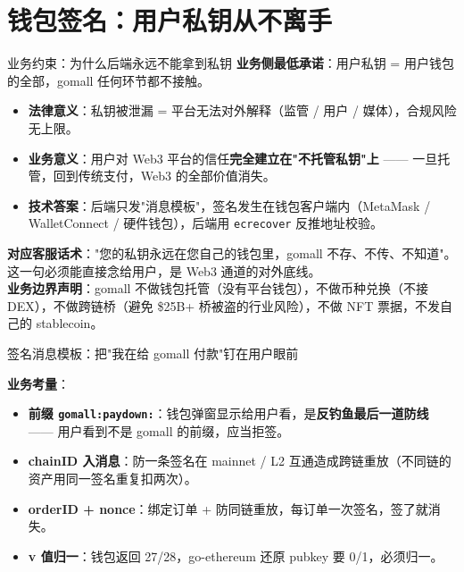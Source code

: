 \documentclass[aspectratio=169,11pt]{beamer}
\begin{document}
\section{钱包签名：用户私钥从不离手}

\begin{frame}[shrink]{业务约束：为什么后端永远不能拿到私钥}
\textbf{业务侧最低承诺}：用户私钥 = 用户钱包的全部，gomall 任何环节都不接触。
\begin{itemize}
  \item \textbf{法律意义}：私钥被泄漏 = 平台无法对外解释（监管 / 用户 / 媒体），合规风险无上限。
  \item \textbf{业务意义}：用户对 Web3 平台的信任\textbf{完全建立在"不托管私钥"上} —— 一旦托管，回到传统支付，Web3 的全部价值消失。
  \item \textbf{技术答案}：后端只发"消息模板"，签名发生在钱包客户端内（MetaMask / WalletConnect / 硬件钱包），后端用 \texttt{ecrecover} 反推地址校验。
\end{itemize}
\vspace{1mm}
\small \textbf{对应客服话术}："您的私钥永远在您自己的钱包里，gomall 不存、不传、不知道"。
这一句必须能直接念给用户，是 Web3 通道的对外底线。\\
\textbf{业务边界声明}：gomall 不做钱包托管（没有平台钱包），不做币种兑换（不接 DEX），不做跨链桥（避免 \$25B+ 桥被盗的行业风险），不做 NFT 票据，不发自己的 stablecoin。
\end{frame}

\begin{frame}[shrink]{签名消息模板：把"我在给 gomall 付款"钉在用户眼前}
\vspace{1mm}
\small \textbf{业务考量}：
\begin{itemize}
  \item \textbf{前缀 \texttt{gomall:paydown:}}：钱包弹窗显示给用户看，是\textbf{反钓鱼最后一道防线} —— 用户看到不是 gomall 的前缀，应当拒签。
  \item \textbf{chainID 入消息}：防一条签名在 mainnet / L2 互通造成跨链重放（不同链的资产用同一签名重复扣两次）。
  \item \textbf{orderID + nonce}：绑定订单 + 防同链重放，每订单一次签名，签了就消失。
  \item \textbf{v 值归一}：钱包返回 27/28，go-ethereum 还原 pubkey 要 0/1，必须归一。
\end{itemize}
\end{frame}
\end{document}
